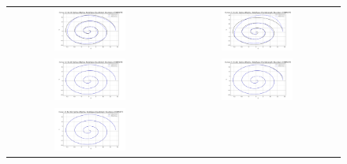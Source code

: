 \documentclass[a4paper]{article}
\begin{document}
\begin{sloppypar}
\begin{figure}[H]
  \centering
  \begin{tabular}{cc}
    \includegraphics[width=0.45\textwidth]{../figure/problemE/N_10_r2_BSpline_Equidistant_COMPLETE.png}  &
    \includegraphics[width=0.45\textwidth]{../figure/problemE/N_10_r2_BSpline_ChordalLength_COMPLETE.png}  \\
    \includegraphics[width=0.45\textwidth]{../figure/problemE/N_40_r2_BSpline_Equidistant_COMPLETE.png}  &
    \includegraphics[width=0.45\textwidth]{../figure/problemE/N_40_r2_BSpline_ChordalLength_COMPLETE.png}  \\
    \includegraphics[width=0.45\textwidth]{../figure/problemE/N_160_r2_BSpline_Equidistant_COMPLETE.png} &

\end{tabular}
\end{figure}
\end{sloppypar}
\end{document}
